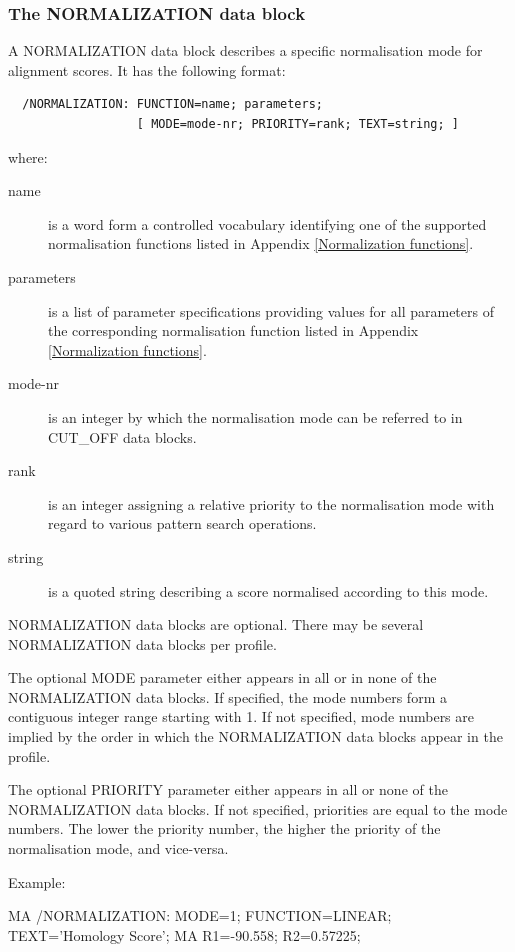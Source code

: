 \documentclass[a4paper,10pt,twoside]{scrartcl}
\begin{document}
 \subsubsection{The NORMALIZATION data block}

  A NORMALIZATION data block describes a specific normalisation mode for alignment scores. It has the following format:
\begin{verbatim}
  /NORMALIZATION: FUNCTION=name; parameters;
                  [ MODE=mode-nr; PRIORITY=rank; TEXT=string; ]
\end{verbatim}
  where:
  \begin{description}
    \item[name] is a word form a controlled vocabulary identifying one of the supported normalisation functions listed in Appendix \ref{Normalization functions}.
    \item[parameters] is a list of parameter specifications providing values for all parameters of the corresponding normalisation function listed in
    Appendix \ref{Normalization functions}.
    \item[mode-nr] is an integer by which the normalisation mode can be referred to in CUT\_OFF data blocks.
    \item[rank] is an integer assigning a relative priority to the normalisation mode with regard to various pattern search operations.
    \item[string] is a quoted string describing a score normalised according to this mode.
  \end{description}
  
  NORMALIZATION data blocks are optional. There may be several NORMALIZATION data blocks per profile.

  The optional MODE parameter either appears in all or in none of the NORMALIZATION data blocks. If specified, the mode numbers form a contiguous
  integer range starting with 1. If not specified, mode numbers are implied by the order in which the NORMALIZATION data blocks appear in the profile.

  The optional PRIORITY parameter either appears in all or none of the NORMALIZATION data blocks. If not specified, priorities are equal to the mode
  numbers. The lower the priority number, the higher the priority of the normalisation mode, and vice-versa.

  Example:

  MA  /NORMALIZATION: MODE=1; FUNCTION=LINEAR; TEXT='Homology Score';
  MA   R1=-90.558; R2=0.57225;
\end{document}
